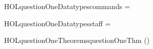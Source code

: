\newcommand{\HOLquestionOneDate}{22 August 2019}
\newcommand{\HOLquestionOneTime}{16:40}
\begin{SaveVerbatim}{HOLquestionOneDatatypescommands}
 =  \HOLTokenBar{} 
\end{SaveVerbatim}
\newcommand{\HOLquestionOneDatatypescommands}{\UseVerbatim{HOLquestionOneDatatypescommands}}
\begin{SaveVerbatim}{HOLquestionOneDatatypesstaff}
 =  \HOLTokenBar{} 
\end{SaveVerbatim}
\newcommand{\HOLquestionOneDatatypesstaff}{\UseVerbatim{HOLquestionOneDatatypesstaff}}
\newcommand{\HOLquestionOneDatatypes}{
\HOLquestionOneDatatypescommands\HOLquestionOneDatatypesstaff}
\begin{SaveVerbatim}{HOLquestionOneTheoremsquestionOneThm}
\HOLTokenTurnstile{} (\HOLSymConst{,}\HOLSymConst{,})      
\end{SaveVerbatim}
\newcommand{\HOLquestionOneTheoremsquestionOneThm}{\UseVerbatim{HOLquestionOneTheoremsquestionOneThm}}
\newcommand{\HOLquestionOneTheorems}{
\HOLThmTag{question1}{question1Thm}\HOLquestionOneTheoremsquestionOneThm
}
